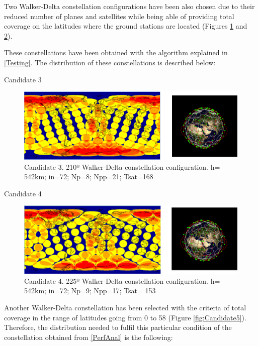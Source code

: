 Two Walker-Delta constellation configurations have been also chosen due to their reduced number of planes and satellites while being able of providing total coverage on the latitudes where the ground stations are located (Figures \ref{fig:Candidate3} and \ref{fig:Candidate4}).

These constellations have been obtained with the algorithm explained in \ref{Testing}. The distribution of these constellations is described below:

Candidate 3

\begin{figure}[H]%
	\centering
	\includegraphics[width=1\textwidth]{Candidate3.png}
	\caption[Candidate 3]{Candidate 3. 210º Walker-Delta constellation configuration. h= 542km; in=72; Np=8; Npp=21; Tsat=168 }
	\label{fig:Candidate3}
\end{figure}

Candidate 4

\begin{figure}[H]%
	\centering
	\includegraphics[width=1\textwidth]{Candidate4.png}
	\caption[Candidate 4]{Candidate 4. 225º Walker-Delta constellation configuration.
			 h= 542km; in=72; Np=9; Npp=17; Tsat= 153}
	\label{fig:Candidate4}
\end{figure}


Another Walker-Delta constellation has been selected with the criteria of total coverage in the range of latitudes going from 0 to 58 (Figure \ref{fig:Candidate5}). Therefore, the distribution needed to fulfil this particular condition of the constellation obtained from \ref{PerfAnal} is the following:

